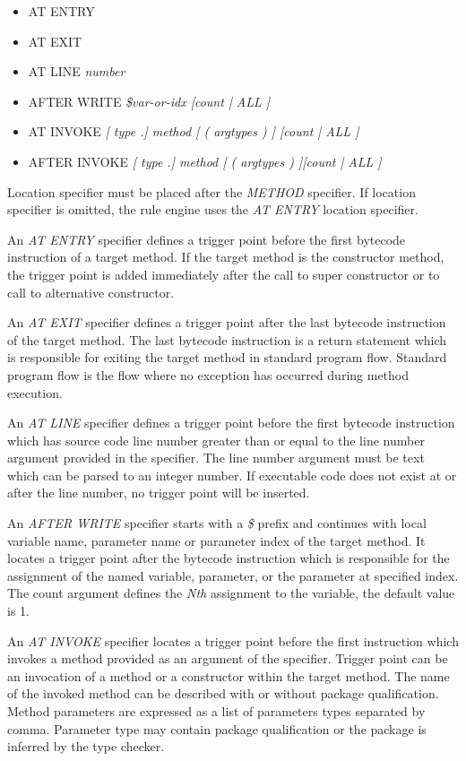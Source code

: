 \documentclass[12pt,oneside]{fithesis2}
\begin{document}
\begin{itemize}
\item	AT ENTRY
\item	AT EXIT
\item	AT LINE \textit{number}
\item	AFTER WRITE \textit{\$var-or-idx [count | ALL ]}
\item	AT INVOKE \textit{[ type .] method [ ( argtypes ) ] [count | ALL ]}
\item	AFTER INVOKE \textit{[ type .] method [ ( argtypes ) ][count | ALL ]}
\end{itemize}

Location specifier must be placed after the \textit{METHOD} specifier. If location specifier is omitted, the rule engine uses the \textit{AT ENTRY} location specifier.

An \textit{AT ENTRY} specifier defines a trigger point before the first bytecode instruction of a target method. If the target method is the constructor method, the trigger point is added immediately after the call to super constructor or to call to alternative constructor.

An \textit{AT EXIT} specifier defines a trigger point after the last bytecode instruction of the target method. The last bytecode instruction is a return statement which is responsible for exiting the target method in standard program flow. Standard program flow is the flow where no exception has occurred during method execution.

An \textit{AT LINE} specifier defines a trigger point before the first bytecode instruction which has source code line number greater than or equal to the line number argument provided in the specifier. The line number argument must be text which can be parsed to an integer number. If executable code does not exist at or after the line number, no trigger point will be inserted.

An \textit{AFTER WRITE} specifier starts with a \textit{\$} prefix and continues with local variable name, parameter name or parameter index of the target method. It locates a trigger point after the bytecode instruction which is responsible for the assignment of the named variable, parameter, or the parameter at specified index. The count argument defines the \textit{Nth} assignment to the variable, the default value is 1.

An \textit{AT INVOKE} specifier locates a trigger point before the first instruction which invokes a method provided as an argument of the specifier. Trigger point can be an invocation of a method or a constructor within the target method. The name of the invoked method can be described with or without package qualification. Method parameters are expressed as a list of parameters types separated by comma. Parameter type may contain package qualification or the package is inferred by the type checker.
\end{document}
